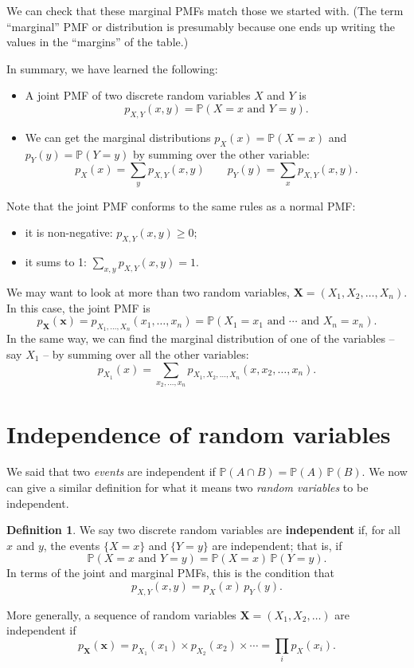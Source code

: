 \documentclass[
  a4paper,
]{book}
\providecommand{\tightlist}{%
  \setlength{\itemsep}{0pt}\setlength{\parskip}{0pt}}
\theoremstyle{definition}
\newtheorem{definition}{Definition}[chapter]
\theoremstyle{definition}
\theoremstyle{definition}
\theoremstyle{definition}
\theoremstyle{remark}
\begin{document}
We can check that these marginal PMFs match those we started with. (The term ``marginal'' PMF or distribution is presumably because one ends up writing the values in the ``margins'' of the table.)

In summary, we have learned the following:

\begin{itemize}
\tightlist
\item
  A joint PMF of two discrete random variables \(X\) and \(Y\) is
  \[ p_{X,Y}(x, y) = \mathbb P(X = x \text{ and } Y = y) . \]
\item
  We can get the marginal distributions \(p_X(x) = \mathbb P(X = x)\) and \(p_Y(y) = \mathbb P(Y = y)\) by summing over the other variable:
  \[ p_X(x) = \sum_y p_{X,Y}(x,y) \qquad p_Y(y) = \sum_x p_{X,Y}(x,y) . \]
\end{itemize}

Note that the joint PMF conforms to the same rules as a normal PMF:

\begin{itemize}
\tightlist
\item
  it is non-negative: \(p_{X,Y}(x,y) \geq 0\);
\item
  it sums to 1: \(\displaystyle\sum_{x,y} p_{X,Y}(x,y) = 1\).
\end{itemize}

We may want to look at more than two random variables, \(\mathbf X = (X_1, X_2, \dots, X_n)\). In this case, the joint PMF is
\[ p_{\mathbf X}(\mathbf x) = p_{X_1, \dots, X_n}(x_1, \dots, x_n) = \mathbb P(X_1 = x_1 \text{ and } \cdots \text{ and } X_n = x_n) .   \]
In the same way, we can find the marginal distribution of one of the variables -- say \(X_1\) -- by summing over all the other variables:
\[ p_{X_1}(x) = \sum_{x_2, \dots, x_n} p_{X_1, X_2, \dots, X_n}(x, x_2, \dots, x_n) . \]

\hypertarget{independence-rv}{%
\section{Independence of random variables}\label{independence-rv}}

We said that two \emph{events} are independent if \(\mathbb P(A \cap B) = \mathbb P(A)\, \mathbb P(B)\). We now can give a similar definition for what it means two \emph{random variables} to be independent.

\begin{definition}
We say two discrete random variables are \textbf{independent} if, for all \(x\) and \(y\), the events \(\{X = x\}\) and \(\{Y = y\}\) are independent; that is, if
\[ \mathbb P(X = x \text{ and } Y = y) = \mathbb P(X = x) \, \mathbb P(Y = y) . \]
In terms of the joint and marginal PMFs, this is the condition that
\[ p_{X,Y}(x,y) = p_X(x) \, p_Y(y) . \]

More generally, a sequence of random variables \(\mathbf X = (X_1, X_2, \dots)\) are independent if
\[ p_{\mathbf X}(\mathbf x) = p_{X_1}(x_1) \times p_{X_2}(x_2) \times \cdots = \prod_{i} p_X(x_i). \]
\end{definition}
\end{document}
